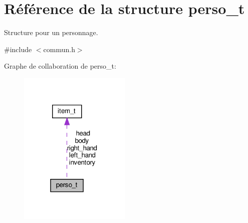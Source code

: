 \hypertarget{structperso__t}{}\section{Référence de la structure perso\+\_\+t}
\label{structperso__t}


Structure pour un personnage.  




{\ttfamily \#include $<$commun.\+h$>$}



Graphe de collaboration de perso\+\_\+t\+:
\nopagebreak
\begin{figure}[H]
\begin{center}
\leavevmode
\includegraphics[width=151pt]{structperso__t__coll__graph}
\end{center}
\end{figure}
